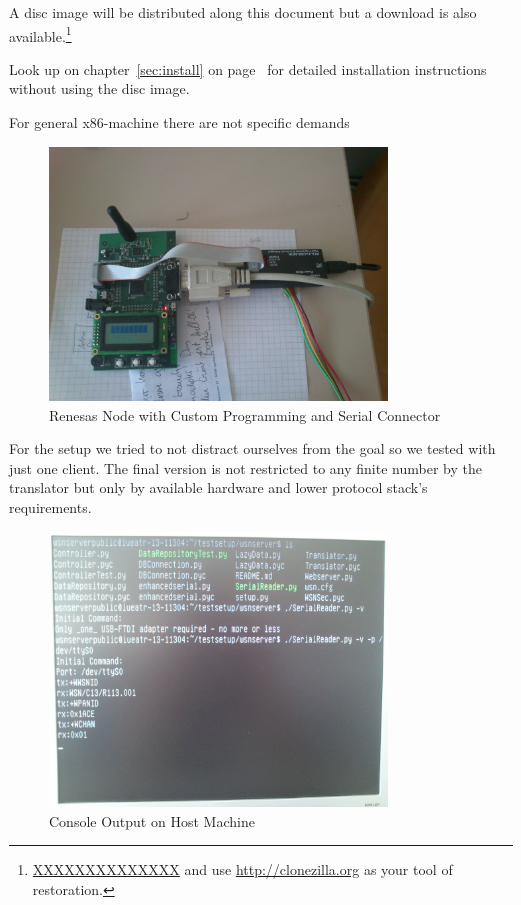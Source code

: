 A disc image will be distributed along this document but a download is also available.\footnote{\url{XXXXXXXXXXXXXX} and use 
\url{http://clonezilla.org} as your tool of restoration.}

Look up on chapter~\ref{sec:install} on page~\pageref{sec:install} for detailed installation instructions without using the disc image.

For general x86-machine there are not specific demands 

\begin{figure}[H]
   \centering
   \includegraphics[width=0.8\textwidth]{pic/controller.jpg}%
   \caption{Renesas Node with Custom Programming and Serial Connector}
   \label{fig:nodepic}%
\end{figure}

For the setup we tried to not distract ourselves from the goal so we tested with just one client. The final version is not restricted
to any finite number by the translator but only by available hardware and lower protocol stack's requirements.

\begin{figure}[H]
   \centering
   \includegraphics[width=0.8\textwidth]{pic/host_machine.jpg}%
   \caption{Console Output on Host Machine}
   \label{fig:hostpic}%
\end{figure}

